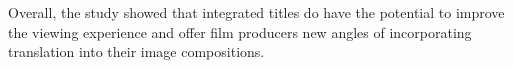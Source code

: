 \documentclass[output=paper]{langsci/langscibook}
\begin{document}
Overall, the study showed that integrated titles do have the potential to improve the viewing experience and offer film producers new angles of incorporating translation into their image compositions.


% 
% 
% 
% 
% 
% 
% 
% 
% 
% 
% 
% 
% 
% 
% 
% 
% 
% 
% 
% 
% 
% 
% 
% 
% 
% 
% 
% 
% 
% 
% 
% 
% 
% 
% 
% 
% 
% 
% 
% 
% 
% 
% 
% 
% 
% 
% 
\end{document}
